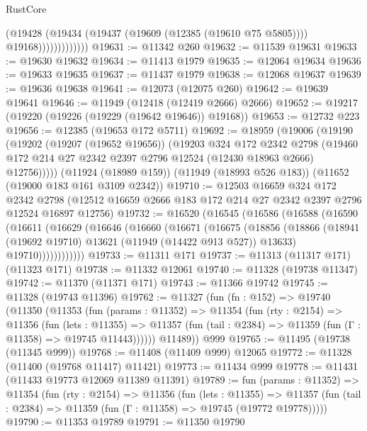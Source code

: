 \begin{lexlean}{RustCore}
\begin{coremodule}
                          (@19428
                            (@19434
                              (@19437 (@19609 (@12385 (@19610 @75 @5805))))
                              @19168)))))))))))))
@19631 := @11342 @260
@19632 := @11539 @19631
@19633 := @19630 @19632
@19634 := @11413 @1979
@19635 := @12064 @19634
@19636 := @19633 @19635
@19637 := @11437 @1979
@19638 := @12068 @19637
@19639 := @19636 @19638
@19641 := @12073 (@12075 @260)
@19642 := @19639 @19641
@19646 := @11949 (@12418 (@12419 @2666) @2666)
@19652 := @19217 (@19220 (@19226 (@19229 (@19642 @19646)) @19168))
@19653 := @12732 @223
@19656 := @12385 (@19653 @172 @5711)
@19692 := @18959
    (@19006
      (@19190
        (@19202
          (@19207 (@19652 @19656))
          (@19203
            @324
            @172
            @2342
            @2798
            (@19460 @172 @214 @27 @2342 @2397 @2796 @12524 (@12430 @18963 @2666) @12756)))))
    (@11924 (@18989 @159))
    (@11949 (@18993 @526 @183))
    (@11652 (@19000 @183 @161 @3109 @2342))
@19710 := @12503
    @16659
    @324
    @172
    @2342
    @2798
    (@12512 @16659 @2666 @183 @172 @214 @27 @2342 @2397 @2796 @12524 @16897 @12756)
@19732 := @16520
    (@16545
      (@16586
        (@16588
          (@16590
            (@16611
              (@16629
                (@16646
                  (@16660
                    (@16671
                      (@16675
                        (@18856
                          (@18866
                            (@18941 (@19692 @19710) @13621 (@11949 (@14422 @913 @527)) @13633)
                            @19710))))))))))))
@19733 := @11311 @171
@19737 := @11313 (@11317 @171) (@11323 @171)
@19738 := @11332 @12061
@19740 := @11328 (@19738 @11347)
@19742 := @11370 (@11371 @171)
@19743 := @11366 @19742
@19745 := @11328 (@19743 @11396)
@19762 := @11327
    (fun (fn : @152) =>
    @19740
      (@11350
        (@11353
          (fun (params : @11352) =>
          @11354
            (fun (rty : @2154) =>
            @11356
              (fun (lets : @11355) =>
              @11357 (fun (tail : @2384) => @11359 (fun (Γ : @11358) => @19745 @11443))))))
        @11489))
    @999
@19765 := @11495 (@19738 (@11345 @999))
@19768 := @11408 (@11409 @999) @12065
@19772 := @11328 (@11400 (@19768 @11417) @11421)
@19773 := @11434 @999
@19778 := @11431 (@11433 @19773 @12069 @11389 @11391)
@19789 := fun (params : @11352) =>
  @11354
    (fun (rty : @2154) =>
    @11356
      (fun (lets : @11355) =>
      @11357 (fun (tail : @2384) => @11359 (fun (Γ : @11358) => @19745 (@19772 @19778)))))
@19790 := @11353 @19789
@19791 := @11350 @19790

\end{coremodule}
\end{lexlean}
